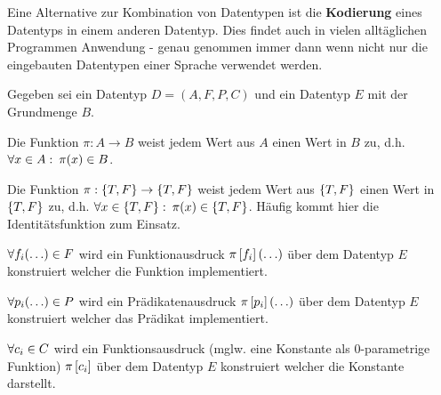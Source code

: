 {\begin{comment}
\[\I{E}{\delta,\omega'}{nth(x,y)} = \ebr{}\]
Was das geforderte Ergebnis für diesen Fall ist.
\item Fall $\abs{\omega'(\tu{x})} \geq \omega'(\tu{y})$:
\[\I{E}{\delta,\omega'}{nth(x,y)} = \ell'_{\omega'(\tu{y})} = \ell'_{n} = \ell_{n+1}\]
Was ebenfalls das geforderte Ergebnis für diesen Fall ist.
\end{\whichitem}
\end{\whichitem}
Damit ist der Beweis erbracht. Wir stellen fest, dass Beweise von $\lng{E}$-Programmen oft kürzer sind als
die Interpretation für einen bestimmten Eingabewert.
\end{bsp}
\ifthenelse{\boolean{long}}{}{\end{comment}}

Eine Alternative zur Kombination von Datentypen ist die \textbf{Kodierung} eines Datentyps in einem anderen Datentyp.
Dies findet auch in vielen alltäglichen Programmen Anwendung - genau genommen immer dann wenn nicht nur die eingebauten Datentypen einer Sprache verwendet werden.

\begin{defn}
Gegeben sei ein Datentyp $D=(A,F,P,C)$ und ein Datentyp $E$ mit der Grundmenge $B$.
\begin{\whichitem}
\item Die Funktion $\pi: A \to B$ weist jedem Wert aus $A$ einen Wert in $B$ zu, d.h. $\text{$\forall$} x \in A: \: \pi(x) \in B$.
\item Die Funktion $\pi: \left\{T,F\right\} \to \left\{T,F\right\}$ weist jedem Wert aus $\left\{T,F\right\}$ einen Wert in $\left\{T,F\right\}$ zu, d.h. $\text{$\forall$} x \in \left\{T,F\right\}: \: \pi(x) \in \left\{T,F\right\}$. Häufig kommt hier die Identitätsfunktion zum Einsatz.
\item $\text{$\forall$} f_i(\ldots) \in F$ wird ein Funktionausdruck $\pi\left[f_i\right](\ldots)$ über dem Datentyp $E$ konstruiert welcher die Funktion implementiert.
\item $\text{$\forall$} p_i(\ldots) \in P$ wird ein Prädikatenausdruck $\pi\left[p_i\right](\ldots)$ über dem Datentyp $E$ konstruiert welcher das Prädikat implementiert.
\item $\text{$\forall$} c_i \in C$ wird ein Funktionsausdruck (mglw. eine Konstante als 0-parametrige Funktion) $\pi\left[c_i\right]$ über dem Datentyp $E$ konstruiert welcher die Konstante darstellt.
\end{\whichitem}
\end{defn}


